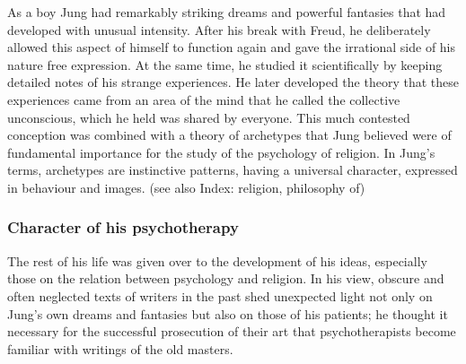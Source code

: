 \documentclass[12pt]{article}
\begin{document}
                                      As a boy Jung had remarkably striking dreams and powerful fantasies
                                      that had developed with unusual intensity. After his break with Freud,
                                      he deliberately allowed this aspect of himself to function again and
                                      gave the irrational side of his nature free expression. At the same
                                      time, he studied it scientifically by keeping detailed notes of his
                                      strange experiences. He later developed the theory that these
                                      experiences came from an area of the mind that he called the
                                      collective unconscious, which he held was shared by everyone. This
                                      much contested conception was combined with a theory of archetypes
                                      that Jung believed were of fundamental importance for the study of
                                      the psychology of religion. In Jung's terms, archetypes are instinctive
                                      patterns, having a universal character, expressed in behaviour and
                                      images. (see also Index: religion, philosophy of) 

\subsubsection{Character of his psychotherapy}
The rest of his life was given over to the development of his ideas,
                                      especially those on the relation between psychology and religion. In
                                      his view, obscure and often neglected texts of writers in the past
                                      shed unexpected light not only on Jung's own dreams and fantasies but
                                      also on those of his patients; he thought it necessary for the
                                      successful prosecution of their art that psychotherapists become
                                      familiar with writings of the old masters. 
\end{document}
